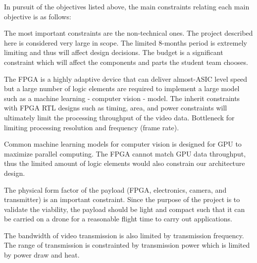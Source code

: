 In pursuit of the objectives listed above, the main constraints relating 
each main objective is as follows:

The most important constraints are the non-technical ones. The project described
here is considered very large in scope. The limited 8-months period is extremely
limiting and thus will affect design decisions. The budget is a significant
constraint which will affect the components and parts the student team chooses.

The FPGA is a highly adaptive device that can deliver almost-ASIC level speed
but a large number of logic elements are required to implement a large model 
such as a machine learning - computer vision - model. The inherit constraints
with FPGA RTL designs such as timing, area, and power constraints will ultimately
limit the processing throughput of the video data. Bottleneck for limiting
processing resolution and frequency (frame rate).

Common machine learning models for computer vision is designed for GPU to
maximize parallel computing. The FPGA cannot match GPU data throughput, thus
the limited amount of logic elements would also constrain our architecture
design.

The physical form factor of the payload (FPGA, electronics, camera, and 
transmitter) is an important constraint. Since the purpose of the project
is to validate the viability, the payload should be light and compact such
that it can be carried on a drone for a reasonable flight time to carry
out applications.

The bandwidth of video transmission is also limited by transmission frequency.
The range of transmission is constrainted by transmission power which is 
limited by power draw and heat.